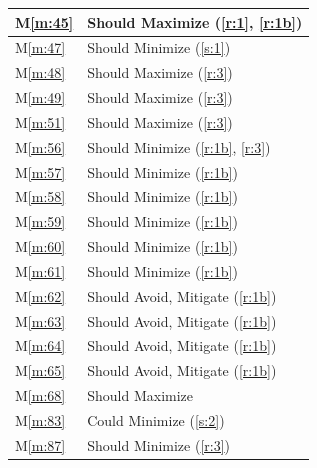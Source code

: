 \documentclass{report}
\newcommand{\mref}[1]{M\ref{#1}}
\begin{document}
\begin{tabular}{|l|p{14.35cm}|}
    \hline
    \mref{m:45} & Should Maximize \hfill (\ref{r:1}, \ref{r:1b}) \\
    \hline
    \mref{m:47} & Should Minimize \hfill (\ref{s:1}) \\
    \hline
    \mref{m:48} & Should Maximize \hfill (\ref{r:3}) \\
    \hline
    \mref{m:49} & Should Maximize \hfill (\ref{r:3}) \\
    \hline
    \mref{m:51} & Should Maximize \hfill (\ref{r:3}) \\
    \hline
    \mref{m:56} & Should Minimize \hfill (\ref{r:1b}, \ref{r:3}) \\
    \hline
    \mref{m:57} & Should Minimize \hfill (\ref{r:1b}) \\
    \hline
    \mref{m:58} & Should Minimize \hfill (\ref{r:1b}) \\
    \hline
    \mref{m:59} & Should Minimize \hfill (\ref{r:1b}) \\
    \hline
    \mref{m:60} & Should Minimize \hfill (\ref{r:1b}) \\
    \hline
    \mref{m:61} & Should Minimize \hfill (\ref{r:1b}) \\
    \hline
    \mref{m:62} & Should Avoid, Mitigate \hfill (\ref{r:1b}) \\
    \hline
    \mref{m:63} & Should Avoid, Mitigate \hfill (\ref{r:1b}) \\
    \hline
    \mref{m:64} & Should Avoid, Mitigate \hfill (\ref{r:1b}) \\
    \hline
    \mref{m:65} & Should Avoid, Mitigate \hfill (\ref{r:1b}) \\
    \hline
    \mref{m:68} & Should Maximize \hfill \cite{applicantguide} \\
    \hline
    \mref{m:83} & Could Minimize \hfill (\ref{s:2}) \\
    \hline
    \mref{m:87} & Should Minimize \hfill (\ref{r:3}) \\
    \hline
\end{tabular}

\end{document}
